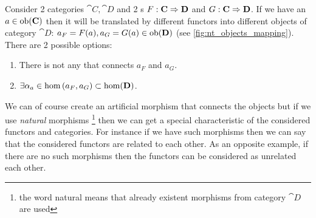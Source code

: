 Consider 2 categories $\cat{C}, \cat{D}$ and 2
s $F: \mathbf{C} \Rightarrow \mathbf{D}$ and $G:
\mathbf{C} \Rightarrow \mathbf{D}$. If we have an  $a \in \mathrm{ob}(\mathbf{C})$ then
it will be translated by different functors into different objects of
category $\cat{D}$: $a_F = F(a), a_G = G(a) \in \mathrm{ob}(\mathbf{D})$ (see
\cref{fig:nt_objects_mapping}). There are 2 possible options:
\begin{enumerate}
\item There is not any  that connects $a_F$
  and $a_G$.
\item $\exists \alpha_a \in \catmset{a_F}{a_G} \subset
  \cathom{D}$. 
\end{enumerate}
We can of course create an artificial morphism that connects the
objects but if we use \textit{natural} morphisms 
\footnote{the word natural means that already existent morphisms from
  category $\cat{D}$ are used}
then we can get a
special characteristic of the considered functors and categories. For
instance if we have such morphisms then we can say that the
considered functors are related to each other. As an opposite example, if there
are no such morphisms then the functors can be considered as unrelated
each other. 

